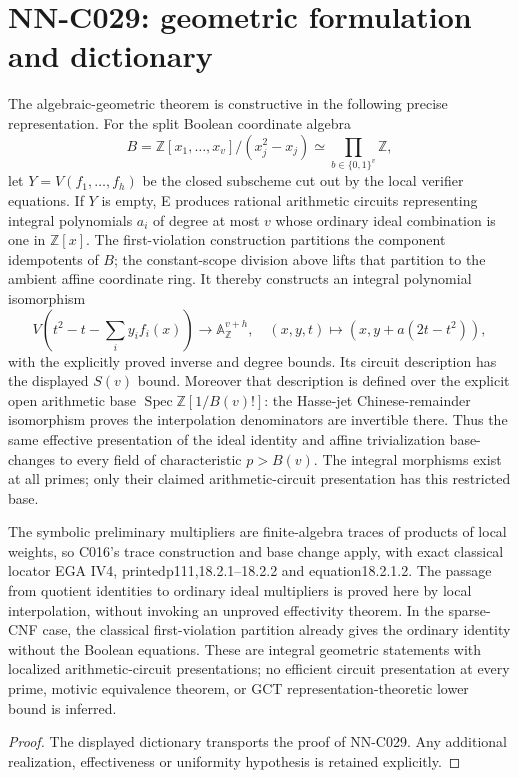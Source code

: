 \section{NN-C029: geometric formulation and dictionary}
\begin{geometricstatement}[NN-C029]
The algebraic-geometric theorem is constructive in the following precise representation. For the split Boolean coordinate algebra
\[
 B=\mathbb Z[x_1,\ldots,x_v]/(x_j^2-x_j)
                 \simeq\prod_{b\in\{0,1\}^v}\mathbb Z,
\]
let $Y=V(f_1,\ldots,f_h)$ be the closed subscheme cut out by the local verifier equations. If $Y$ is empty, E produces rational arithmetic circuits representing integral polynomials $a_i$ of degree at most $v$ whose ordinary ideal combination is one in $\mathbb Z[x]$. The first-violation construction partitions the component idempotents of $B$; the constant-scope division above lifts that partition to the ambient affine coordinate ring. It thereby constructs an integral polynomial isomorphism
\[
 V\left(t^2-t-\sum_i y_i f_i(x)\right)
        \longrightarrow\mathbb A^{v+h}_{\mathbb Z},
 \quad (x,y,t)\longmapsto(x,y+a(2t-t^2)),
\]
with the explicitly proved inverse and degree bounds. Its circuit description has the displayed $S(v)$ bound. Moreover that description is defined over the explicit open arithmetic base $\operatorname{Spec}\mathbb Z[1/B(v)!]$: the Hasse-jet Chinese-remainder isomorphism proves the interpolation denominators are invertible there. Thus the same effective presentation of the ideal identity and affine trivialization base-changes to every field of characteristic $p>B(v)$. The integral morphisms exist at all primes; only their claimed arithmetic-circuit presentation has this restricted base.

The symbolic preliminary multipliers are finite-algebra traces of products of local weights, so C016's trace construction and base change apply, with exact classical locator EGA IV4, printedp111,18.2.1--18.2.2 and equation18.2.1.2. The passage from quotient identities to ordinary ideal multipliers is proved here by local interpolation, without invoking an unproved effectivity theorem. In the sparse-CNF case, the classical first-violation partition already gives the ordinary identity without the Boolean equations. These are integral geometric statements with localized arithmetic-circuit presentations; no efficient circuit presentation at every prime, motivic equivalence theorem, or GCT representation-theoretic lower bound is inferred.
\end{geometricstatement}
\begin{proof} The displayed dictionary transports the proof of NN-C029. Any additional realization, effectiveness or uniformity hypothesis is retained explicitly.\end{proof}


